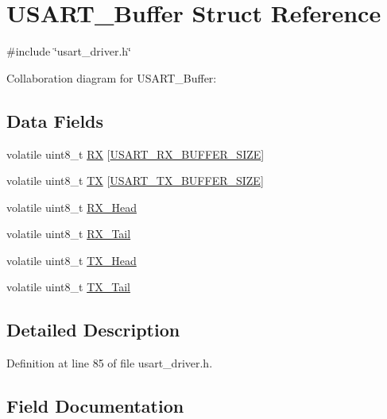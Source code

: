 \hypertarget{struct_u_s_a_r_t___buffer}{}\section{U\+S\+A\+R\+T\+\_\+\+Buffer Struct Reference}
\label{struct_u_s_a_r_t___buffer}


{\ttfamily \#include \char`\"{}usart\+\_\+driver.\+h\char`\"{}}



Collaboration diagram for U\+S\+A\+R\+T\+\_\+\+Buffer\+:
\subsection*{Data Fields}
\begin{DoxyCompactItemize}
\item 
volatile uint8\+\_\+t \hyperlink{struct_u_s_a_r_t___buffer_a3b83538f34138ed63ae42daeaa092639}{RX} \mbox{[}\hyperlink{usart__driver_8h_ac0999c0821d14cfab43e6f3c778c2b95}{U\+S\+A\+R\+T\+\_\+\+R\+X\+\_\+\+B\+U\+F\+F\+E\+R\+\_\+\+S\+I\+ZE}\mbox{]}
\item 
volatile uint8\+\_\+t \hyperlink{struct_u_s_a_r_t___buffer_a392312bfc5a33886fa4c6999cea21ecc}{TX} \mbox{[}\hyperlink{usart__driver_8h_a21d527450b438bba8dab02e03f021ee3}{U\+S\+A\+R\+T\+\_\+\+T\+X\+\_\+\+B\+U\+F\+F\+E\+R\+\_\+\+S\+I\+ZE}\mbox{]}
\item 
volatile uint8\+\_\+t \hyperlink{struct_u_s_a_r_t___buffer_aca7bb6ebcc2a3f266fac41649a250041}{R\+X\+\_\+\+Head}
\item 
volatile uint8\+\_\+t \hyperlink{struct_u_s_a_r_t___buffer_acbe55e05936cb836303c2fd41ec2d734}{R\+X\+\_\+\+Tail}
\item 
volatile uint8\+\_\+t \hyperlink{struct_u_s_a_r_t___buffer_ae18341a2700d746f90841b29ce8b05ca}{T\+X\+\_\+\+Head}
\item 
volatile uint8\+\_\+t \hyperlink{struct_u_s_a_r_t___buffer_ab4c125e286a5f36c1f44256fd35eb66d}{T\+X\+\_\+\+Tail}
\end{DoxyCompactItemize}


\subsection{Detailed Description}


Definition at line 85 of file usart\+\_\+driver.\+h.



\subsection{Field Documentation}
\hypertarget{struct_u_s_a_r_t___buffer_a3b83538f34138ed63ae42daeaa092639}{}\label{struct_u_s_a_r_t___buffer_a3b83538f34138ed63ae42daeaa092639} 
